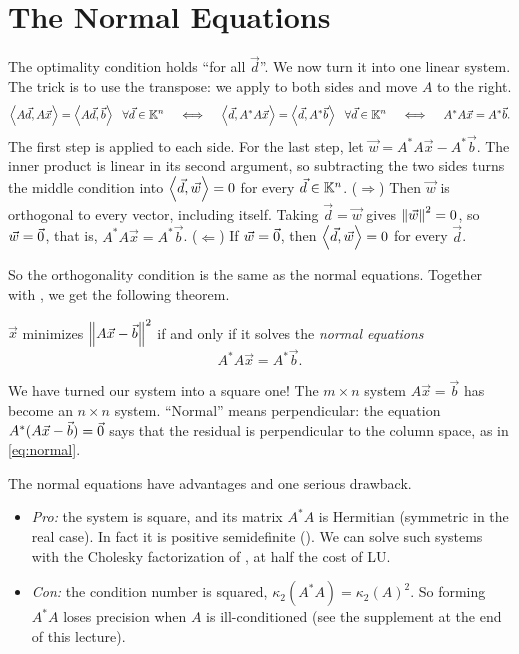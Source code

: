 \section{The Normal Equations}
\label{sec:normal-eq}

The optimality condition holds ``for all $\vec{d}$''. We now turn it into one linear system. The trick is to use the transpose: we apply  to both sides and move $A$ to the right.
\begin{equation}
  \ip{A\vec{d}}{A\vec{x}} = \ip{A\vec{d}}{\vec{b}} \ \ \forall\vec{d} \in \K^n
  \quad\iff\quad
  \ip{\vec{d}}{A^\ast A\vec{x}} = \ip{\vec{d}}{A^\ast\vec{b}} \ \ \forall\vec{d} \in \K^n
  \quad\iff\quad
  A^\ast A\vec{x} = A^\ast\vec{b}.
\end{equation}
The first step is  applied to each side. For the last step, let $\vec{w} = A^\ast A\vec{x} - A^\ast\vec{b}$. The inner product is linear in its second argument, so subtracting the two sides turns the middle condition into $\left\langle \vec{d}, \vec{w} \right\rangle = 0$ for every $\vec{d} \in \mathbb{K}^n$. ($\Rightarrow$) Then $\vec{w}$ is orthogonal to every vector, including itself. Taking $\vec{d} = \vec{w}$ gives $\left\lVert \vec{w} \right\rVert^2 = 0$, so $\vec{w} = \vec{0}$, that is, $A^\ast A\vec{x} = A^\ast\vec{b}$. ($\Leftarrow$) If $\vec{w} = \vec{0}$, then $\left\langle \vec{d}, \vec{w} \right\rangle = 0$ for every $\vec{d}$.

So the orthogonality condition is the same as the normal equations. Together with , we get the following theorem.

\begin{theorem}
  \label{thm:normal}
  $\vec{x}$ minimizes $\left\lVert A\vec{x} - \vec{b} \right\rVert^2$ if and only if it solves the \emph{normal equations}
  \begin{equation}
    A^\ast A\vec{x} = A^\ast\vec{b}.
  \end{equation}
\end{theorem}

We have turned our system into a square one! The $m \times n$ system $A\vec{x} = \vec{b}$ has become an $n \times n$ system. ``Normal'' means perpendicular: the equation $A^\ast(A\vec{x} - \vec{b}) = \vec{0}$ says that the residual is perpendicular to the column space, as in \eqref{eq:normal}.

The normal equations have advantages and one serious drawback.
\begin{itemize}
  \item \emph{Pro:} the system is square, and its matrix $A^\ast A$ is Hermitian (symmetric in the real case). In fact it is positive semidefinite (). We can solve such systems with the Cholesky factorization of , at half the cost of LU.
  \item \emph{Con:} the condition number is squared, $\kappa_2(A^\ast A) = \kappa_2(A)^2$. So forming $A^\ast A$ loses precision when $A$ is ill-conditioned (see the supplement at the end of this lecture).
\end{itemize}

